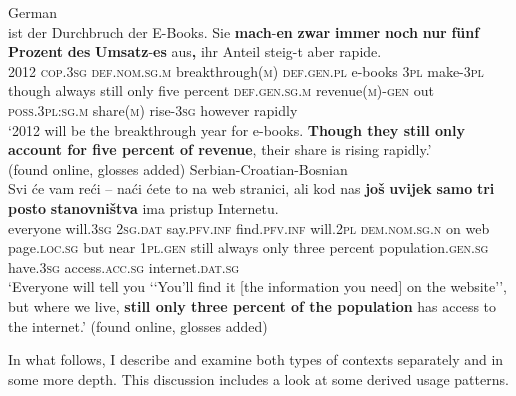 \begin{exe}
	\ex German\label{exScalarImmerNochNur}\\
	 ist der Durchbruch der E-Books. Sie \textbf{mach}-\textbf{en} \textbf{zwar} \textbf{immer} \textbf{noch} \textbf{nur} \textbf{fünf} \textbf{Prozent} \textbf{des} \textbf{Umsatz}-\textbf{es} aus\textbf{,} ihr Anteil steig-t aber rapide.\\
	2012 \textsc{cop}.3\textsc{sg} \textsc{def}.\textsc{nom}.\textsc{sg}.\textsc{m} breakthrough(\textsc{m}) \textsc{def}.\textsc{gen}.\textsc{pl} e-books 3\textsc{pl} make-3\textsc{pl} though always still only five percent \textsc{def}.\textsc{gen}.\textsc{sg}.\textsc{m} revenue(\textsc{m})-\textsc{gen} out \textsc{poss}.3\textsc{pl}:\textsc{sg}.\textsc{m} share(\textsc{m}) rise-3\textsc{sg} however rapidly\\
	\glt \lq 2012 will be the breakthrough year for e-books. \textbf{Though they still only account for five percent of revenue}, their share is rising rapidly.\rq{}
	\\(found online, glosses added)%
	\ex Serbian-Croatian-Bosnian\label{exScalarImmerNochSerbian}\\
	\gll Svi će vam reći – naći ćete to na web stranici, ali kod nas \textbf{još} \textbf{uvijek} \textbf{samo} \textbf{tri} \textbf{posto} \textbf{stanovništva} ima pristup Internetu.\\
	everyone will.3\textsc{sg} 2\textsc{sg}.\textsc{dat} say.\textsc{pfv}.\textsc{inf} { } find.\textsc{pfv}.\textsc{inf} will.2\textsc{pl} \textsc{dem}.\textsc{nom}.\textsc{sg}.\textsc{n} on web page.\textsc{loc}.\textsc{sg} but near 1\textsc{pl}.\textsc{gen} still always only three percent population.\textsc{gen}.\textsc{sg} have.3\textsc{sg} access.\textsc{acc}.\textsc{sg} internet.\textsc{dat}.\textsc{sg}\\
	\glt \lq Everyone will tell you \lq\lq{}You’ll find it [the information you need] on the website\rq\rq{}, but where we live, \textbf{still only three percent of the population} has access to the internet.\rq{ }(found online, glosses added)%
\end{exe}

In what follows, I describe and examine both types of contexts separately and in some more depth. This discussion includes a look at some derived usage patterns.


